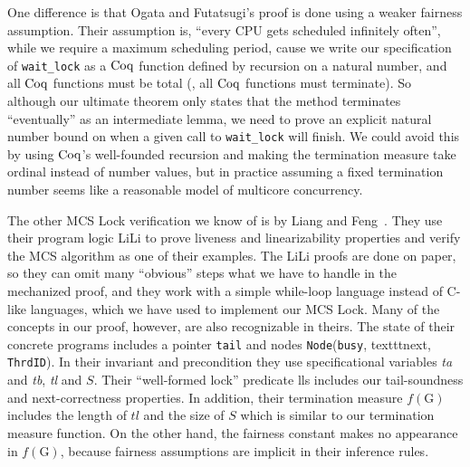 One difference is that Ogata and Futatsugi's proof is
done using a weaker fairness assumption.
Their assumption is, ``every CPU gets
scheduled infinitely often'', while we require a maximum scheduling
period,  cause we write our specification of \lstinline$wait_lock$ as a $\mathrm{Coq}$ function defined by recursion on a natural number, and all $\mathrm{Coq}$ functions must be total (\ie, all $\mathrm{Coq}$ functions must terminate). 
So although our ultimate theorem only states that the method
terminates ``eventually'' as an intermediate lemma, we need to prove an explicit natural number bound on when a given call to
\lstinline$wait_lock$ will finish.  
We could avoid this by using
$\mathrm{Coq}$'s well-founded recursion and
making the termination measure take ordinal instead of number
values, but in practice assuming a fixed termination number seems like a reasonable
model of multicore concurrency.

The other MCS Lock verification we know of is by Liang and
Feng~\cite{lili16}. 
They use their program logic LiLi to prove
liveness and linearizability properties and verify the MCS algorithm
as one of their examples.  
The LiLi proofs are done on paper, so they
can omit many ``obvious'' steps what we have to handle in the mechanized proof, 
and they work with a simple
while-loop language instead of C-like languages, which we have used to implement our MCS Lock.
Many of the concepts in our proof, however, 
are also recognizable in theirs. 
The state of their concrete
  programs includes a pointer \texttt{tail} and nodes
 \texttt{Node}(\texttt{busy}, texttt{next}, \texttt{ThrdID}).
In their invariant and precondition they use specificational variables
\textit{ta} and \textit{tb}, \textit{tl} and $S$. Their
  ``well-formed lock'' predicate \textsf{lls} includes our
  tail-soundness and next-correctness properties.
In addition, their
termination measure $f(\mathrm{G})$ includes the length of
$\mathit{tl}$ and the size of $S$ which is similar to our termination measure function. 
On the other hand, the fairness
constant makes no appearance in $f(\mathrm{G})$, because fairness
assumptions are implicit in their inference rules.

